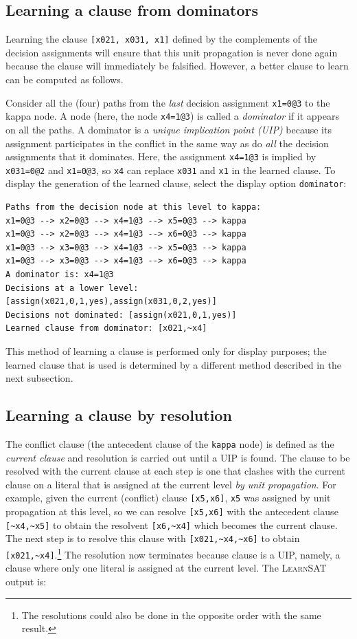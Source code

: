\documentclass[11pt]{report}
\newcommand*{\p}[1]{\textup{\texttt{#1}}}
\newcommand*{\ls}{\textsc{LearnSAT}}
\begin{document}
\subsection{Learning a clause from dominators}

Learning the clause \p{[x021, x031, x1]} defined by the complements of
the decision assignments will ensure that this unit propagation is never
done again because the clause will immediately be falsified.
However, a better clause to learn can be computed as follows. 

Consider all the (four) paths from the \emph{last} decision assignment
\p{x1=0@3} to the kappa node. A node (here, the node \p{x4=1@3}) is
called a \emph{dominator} if it appears on all the paths. A dominator is
a \emph{unique implication point (UIP)} because its assignment
participates in the conflict in the same way as do \emph{all} the
decision assignments that it dominates. Here, the assignment \p{x4=1@3}
is implied by \p{x031=0@2} and \p{x1=0@3}, so \p{x4} can replace
\p{x031} and \p{x1} in the learned clause. To display the generation of
the learned clause, select the display option \p{dominator}:

\begin{verbatim}
Paths from the decision node at this level to kappa:
x1=0@3 --> x2=0@3 --> x4=1@3 --> x5=0@3 --> kappa
x1=0@3 --> x2=0@3 --> x4=1@3 --> x6=0@3 --> kappa
x1=0@3 --> x3=0@3 --> x4=1@3 --> x5=0@3 --> kappa
x1=0@3 --> x3=0@3 --> x4=1@3 --> x6=0@3 --> kappa
A dominator is: x4=1@3
Decisions at a lower level: [assign(x021,0,1,yes),assign(x031,0,2,yes)]
Decisions not dominated: [assign(x021,0,1,yes)]
Learned clause from dominator: [x021,~x4]
\end{verbatim}

This method of learning a clause is performed only for display purposes;
the learned clause that is used is determined by a different method
described in the next subsection.

\subsection{Learning a clause by resolution}

The conflict clause (the antecedent clause of the \p{kappa} node) is
defined as the \emph{current clause} and resolution is carried out until
a UIP is found. The clause to be resolved with the current clause at
each step is one that clashes with the current clause on a literal that
is assigned at the current level \emph{by unit propagation}. For
example, given the current (conflict) clause \p{[x5,x6]}, \p{x5} was
assigned by unit propagation at this level, so we can resolve
\p{[x5,x6]} with the antecedent clause \verb+[~x4,~x5]+ to obtain the
resolvent \verb+[x6,~x4]+ which becomes the current clause. The next
step is to resolve this clause with \verb+[x021,~x4,~x6]+ to obtain
\verb+[x021,~x4]+.\footnote{The resolutions could also be done in the
opposite order with the same result.} The resolution now terminates
because clause is a UIP, namely, a clause where only one literal is
assigned at the current level. The \ls{} output is:
\end{document}
